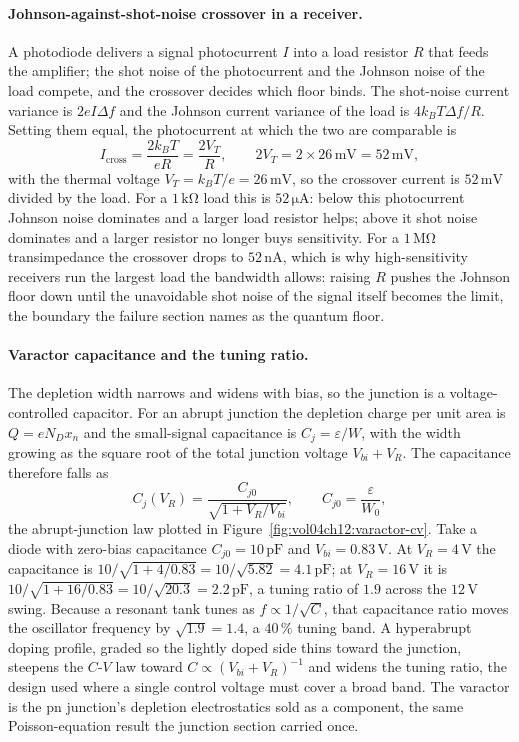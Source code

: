 \paragraph{Johnson-against-shot-noise crossover in a receiver.}
A photodiode delivers a signal photocurrent $I$ into a load resistor $R$
that feeds the amplifier; the shot noise of the photocurrent and the
Johnson noise of the load compete, and the crossover decides which floor
binds. The shot-noise current variance is $2eI\Delta f$ and the Johnson
current variance of the load is $4k_B T\Delta f/R$. Setting them equal,
the photocurrent at which the two are comparable is
\[
I_{\text{cross}} = \frac{2k_B T}{eR} = \frac{2V_T}{R},
\qquad
2V_T = 2\times 26\,\si{\milli\volt} = 52\,\si{\milli\volt},
\]
with the thermal voltage $V_T = k_B T/e = 26\,\si{\milli\volt}$, so the
crossover current is $52\,\si{\milli\volt}$ divided by the load. For a
$1\,\si{\kilo\ohm}$ load this is $52\,\si{\micro\ampere}$: below this
photocurrent Johnson noise dominates and a larger load resistor helps;
above it shot noise dominates and a larger resistor no longer buys
sensitivity. For a $1\,\si{\mega\ohm}$ transimpedance the crossover drops
to $52\,\si{\nano\ampere}$, which is why high-sensitivity receivers run
the largest load the bandwidth allows: raising $R$ pushes the Johnson
floor down until the unavoidable shot noise of the signal itself becomes
the limit, the boundary the failure section names as the quantum floor.

\paragraph{Varactor capacitance and the tuning ratio.}
The depletion width narrows and widens with bias, so the junction is a
voltage-controlled capacitor. For an abrupt junction the depletion charge
per unit area is $Q = eN_D x_n$ and the small-signal capacitance is $C_j =
\varepsilon/W$, with the width growing as the square root of the total
junction voltage $V_{bi}+V_R$. The capacitance therefore falls as
\[
C_j(V_R) = \frac{C_{j0}}{\sqrt{1 + V_R/V_{bi}}},
\qquad
C_{j0} = \frac{\varepsilon}{W_0},
\]
the abrupt-junction law plotted in
Figure~\ref{fig:vol04ch12:varactor-cv}. Take a diode with zero-bias
capacitance $C_{j0} = 10\,\si{\pico\farad}$ and $V_{bi} = 0.83\,\si{\volt}$.
At $V_R = 4\,\si{\volt}$ the capacitance is $10/\sqrt{1 + 4/0.83} =
10/\sqrt{5.82} = 4.1\,\si{\pico\farad}$; at $V_R = 16\,\si{\volt}$ it is
$10/\sqrt{1 + 16/0.83} = 10/\sqrt{20.3} = 2.2\,\si{\pico\farad}$, a tuning
ratio of $1.9$ across the $12\,\si{\volt}$ swing. Because a resonant tank
tunes as $f \propto 1/\sqrt{C}$, that capacitance ratio moves the oscillator
frequency by $\sqrt{1.9} = 1.4$, a $40\,\%$ tuning band. A hyperabrupt
doping profile, graded so the lightly doped side thins toward the junction,
steepens the $C$-$V$ law toward $C \propto (V_{bi}+V_R)^{-1}$ and widens the
tuning ratio, the design used where a single control voltage must cover a
broad band. The varactor is the pn junction's depletion electrostatics sold
as a component, the same Poisson-equation result the junction section carried
once.

